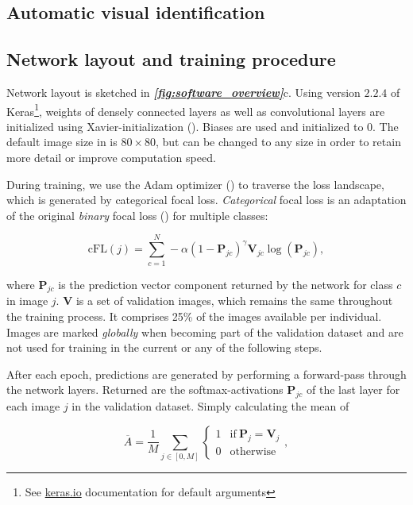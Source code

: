 \documentclass[9pt,lineno]{elife}
\newcommand{\figref}[1]{\textit{\textbf{\ref{#1}}}}
\newcommand{\TRex}{\protect\path{TRex}}
\begin{document}
\begin{appendixbox}
\section{Automatic visual identification} \label{sec:appendix_recognition}

\subsection{Network layout and training procedure}

Network layout is sketched in \figref{fig:software_overview}c. Using version $2.2.4$ of Keras\footnote{See \href{https://keras.io/api/layers/initializers/\#glorotuniform-class}{keras.io} documentation for default arguments}, weights of densely connected layers as well as convolutional layers are initialized using Xavier-initialization (\cite{pmlr-v9-glorot10a}). Biases are used and initialized to 0. The default image size in \TRex{} is $80\times 80$, but can be changed to any size in order to retain more detail or improve computation speed.

During training, we use the Adam optimizer (\cite{kingma2014adam}) to traverse the loss landscape, which is generated by categorical focal loss. \textit{Categorical} focal loss is an adaptation of the original \textit{binary} focal loss (\cite{lin2017focal}) for multiple classes:

$$ \mathrm{cFL}(j) = \sum_{c=1}^N  - \alpha \left(1 - \mathbf{P}_{jc}\right)^\gamma \mathbf{V}_{jc} \log\left(\mathbf{P}_{jc}\right), $$

where $\mathbf{P}_{jc}$ is the prediction vector component returned by the network for class $c$ in image $j$. $\mathbf{V}$ is a set of validation images, which remains the same throughout the training process. It comprises 25\% of the images available per individual. Images are marked \textit{globally} when becoming part of the validation dataset and are not used for training in the current or any of the following steps. 

After each epoch, predictions are generated by performing a forward-pass through the network layers. Returned are the softmax-activations $\mathbf{P}_{jc}$ of the last layer for each image $j$ in the validation dataset. Simply calculating the mean of 

$$ \overline{A} = \frac1M\sum_{j\in[0,M]} \begin{cases} 1 & \mathrm{if}\ \mathbf{P}_j = \mathbf{V}_j \\ 0 & \mathrm{otherwise} \end{cases}, $$


\end{appendixbox}
\end{document}
